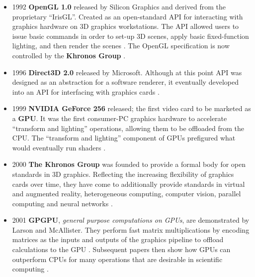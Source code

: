 \documentclass[a4paper,12pt,twoside,openright]{report}
\begin{document}
\begin{itemize}

    \item 1992 \textbf{OpenGL 1.0} released by Silicon Graphics and derived
    from the proprietary ``IrisGL''. Created as an open-standard API for
    interacting with graphics hardware on 3D graphics workstations. The API
    allowed users to issue basic commands in order to set-up 3D scenes, apply
    basic fixed-function lighting, and then render the scenes
    \cite{OpenGL_1_0}. The OpenGL specification is now controlled by the
    \textbf{Khronos Group} \cite{OpenGL} \cite{OpenGLToKhronos}.

    \item 1996 \textbf{Direct3D 2.0} released by Microsoft. Although at this
    point API was designed as an abstraction for a software renderer, it
    eventually developed into an API for interfacing with graphics cards
    \cite{JohnCarmackPlanDirect3DvsOpenGl}.


    \item 1999 \textbf{NVIDIA GeForce 256} released; the first video card to be
    marketed as a \textbf{GPU}. It was the first consumer-PC graphics hardware
    to accelerate ``transform and lighting'' operations, allowing them to be
    offloaded from the CPU. The ``transform and lighting'' component of GPUs
    prefigured what would eventually run shaders \cite{GeForce256}.

    \item 2000 \textbf{The Khronos Group} was founded to provide a formal body
    for open standards in 3D graphics. Reflecting the increasing flexibility of
    graphics cards over time, they have come to additionally provide standards
    in virtual and augmented reality, heterogeneous computing, computer vision,
    parallel computing and neural networks \cite{KhronosGroupAbout}.

    \item 2001 \textbf{GPGPU}, \textit{general purpose computations on GPUs},
    are demonstrated by Larson and McAllister. They perform fast matrix
    multiplications by encoding matrices as the inputs and outputs of the
    graphics pipeline to offload calculations to the GPU \cite{MatrixGPU}.
    Subsequent papers then show how GPUs can outperform CPUs for many
    operations that are desirable in scientific computing \cite{CUDAtoOpenCL}
    \cite{Kruger03linearalgebra} \cite{LUGPU} \cite{SparsematrixGPU}.


\end{itemize}
\end{document}
